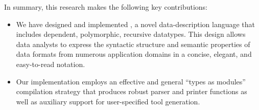 

In summary, this research makes the following key contributions:
\begin{itemize}
\item We have designed and implemented \padsml{}, a novel
data-description language that includes 
dependent, polymorphic, recursive datatypes.  This design
allows data analysts to express the syntactic
structure and semantic properties of data formats from numerous
application domains in a concise, elegant, and easy-to-read notation.  
\item Our \padsml{} implementation employs an effective and
general ``types as modules'' compilation strategy
that produces robust parser and printer functions
as well as auxiliary support for user-specified tool generation.
\end{itemize}


